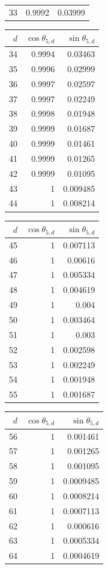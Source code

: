 {\begin{tabular}[t]{r|rr}
33 & 0.9992 & 0.03999
\end{tabular}\kern4pt
\begin{tabular}[t]{r|rr}
$d$ & $\cos\theta_{5,d}$ & $\sin\theta_{5,d}$ \\\hline
34 & 0.9994 & 0.03463 \\
35 & 0.9996 & 0.02999 \\
36 & 0.9997 & 0.02597 \\
37 & 0.9997 & 0.02249 \\
38 & 0.9998 & 0.01948 \\
39 & 0.9999 & 0.01687 \\
40 & 0.9999 & 0.01461 \\
41 & 0.9999 & 0.01265 \\
42 & 0.9999 & 0.01095 \\
43 & 1 & 0.009485 \\
44 & 1 & 0.008214
\end{tabular}\kern4pt
\begin{tabular}[t]{r|rr}
$d$ & $\cos\theta_{5,d}$ & $\sin\theta_{5,d}$ \\\hline
45 & 1 & 0.007113 \\
46 & 1 & 0.00616 \\
47 & 1 & 0.005334 \\
48 & 1 & 0.004619 \\
49 & 1 & 0.004 \\
50 & 1 & 0.003464 \\
51 & 1 & 0.003 \\
52 & 1 & 0.002598 \\
53 & 1 & 0.002249 \\
54 & 1 & 0.001948 \\
55 & 1 & 0.001687
\end{tabular}\kern4pt
\begin{tabular}[t]{r|rr}
$d$ & $\cos\theta_{5,d}$ & $\sin\theta_{5,d}$ \\\hline
56 & 1 & 0.001461 \\
57 & 1 & 0.001265 \\
58 & 1 & 0.001095 \\
59 & 1 & 0.0009485 \\
60 & 1 & 0.0008214 \\
61 & 1 & 0.0007113 \\
62 & 1 & 0.000616 \\
63 & 1 & 0.0005334 \\
64 & 1 & 0.0004619
\end{tabular}}

